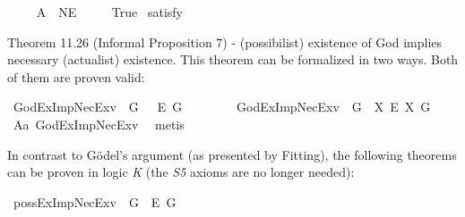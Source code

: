 \begin{isabellebody}
\ \ \isanewline
{}\isamarkupfalse%
\ \ A{}{\isacharcolon}\ {\isachardoublequoteopen}{\isasymlfloor}{\isasymP}\ {\isasymdown}NE{\isasymrfloor}{\isachardoublequoteclose}\ \ \ \ \isanewline
{}\isamarkupfalse%
\ True\ \isamarkupfalse%
{\isacharbrackleft}satisfy{\isacharbrackright}%
\ %
%
\isamarkupfalse%
\ %
%
%
%
%
\begin{isamarkuptext}%
Theorem 11.26 (Informal Proposition 7) - (possibilist) existence of God implies necessary (actualist) existence.
This theorem can be formalized in two ways. Both of them are proven valid:%
\end{isamarkuptext}\isamarkuptrue%
\isamarkupfalse%
\ GodExImpNecEx{\isacharunderscore}v{}{\isacharcolon}\ {\isachardoublequoteopen}{\isasymlfloor}\isactrlbold {\isasymexists}\ \isactrlbold {\isasymdown}G\ \isactrlbold {\isasymrightarrow}\ \ \isactrlbold {\isasymbox}\isactrlbold {\isasymexists}\isactrlsup E\ \isactrlbold {\isasymdown}G{\isasymrfloor}{\isachardoublequoteclose}%
\ %
%
\isamarkupfalse%
\ {\isacharminus}\ %
%
%
%
\ \ \isanewline
{}\isamarkupfalse%
\ GodExImpNecEx{\isacharunderscore}v{}{\isacharcolon}\ {\isachardoublequoteopen}{\isasymlfloor}\isactrlbold {\isasymexists}\ \isactrlbold {\isasymdown}G\ \isactrlbold {\isasymrightarrow}\ {\isacharparenleft}{\isacharparenleft}{\isasymlambda}X{\isachardot}\ \isactrlbold {\isasymbox}\isactrlbold {\isasymexists}\isactrlsup E\ X{\isacharparenright}\ \isactrlbold {\isasymdown}G{\isacharparenright}{\isasymrfloor}{\isachardoublequoteclose}\isanewline
%
\ \ %
%
\isamarkupfalse%
\ A{}a\ GodExImpNecEx{\isacharunderscore}v{}\ \isamarkupfalse%
\ metis\ %
%
%
%
%
\begin{isamarkuptext}%
In contrast to G\"odel's argument (as presented by Fitting), the following theorems can be proven in logic \emph{K}
 (the \emph{S5} axioms are no longer needed):%
\end{isamarkuptext}\isamarkuptrue%
\isamarkupfalse%
\ possExImpNecEx{\isacharunderscore}v{}{\isacharcolon}\ {\isachardoublequoteopen}{\isasymlfloor}\isactrlbold {\isasymdiamond}\isactrlbold {\isasymexists}\ \isactrlbold {\isasymdown}G\ \isactrlbold {\isasymrightarrow}\ \isactrlbold {\isasymbox}\isactrlbold {\isasymexists}\isactrlsup E\ \isactrlbold {\isasymdown}G{\isasymrfloor}{\isachardoublequoteclose}\isanewline

\end{isabellebody}
